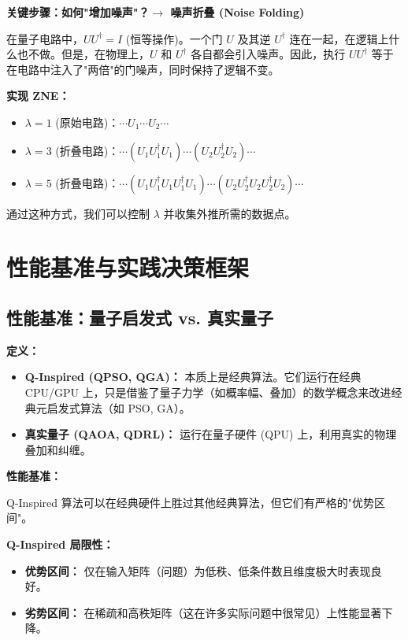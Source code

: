 \documentclass[11pt,a4paper]{article}
\begin{document}
\textbf{关键步骤：如何"增加噪声"？$\rightarrow$ 噪声折叠 (Noise Folding)}

在量子电路中，$U U^\dagger = I$ (恒等操作)。一个门 $U$ 及其逆 $U^\dagger$ 连在一起，在逻辑上什么也不做。但是，在物理上，$U$ 和 $U^\dagger$ 各自都会引入噪声。因此，执行 $U U^\dagger$ 等于在电路中注入了"两倍"的门噪声，同时保持了逻辑不变。

\textbf{实现 ZNE：}
\begin{itemize}
\item $\lambda=1$ (原始电路)：$\cdots U_1 \cdots U_2 \cdots$
\item $\lambda=3$ (折叠电路)：$\cdots (U_1 U_1^\dagger U_1) \cdots (U_2 U_2^\dagger U_2) \cdots$
\item $\lambda=5$ (折叠电路)：$\cdots (U_1 U_1^\dagger U_1 U_1^\dagger U_1) \cdots (U_2 U_2^\dagger U_2 U_2^\dagger U_2) \cdots$
\end{itemize}

通过这种方式，我们可以控制 $\lambda$ 并收集外推所需的数据点。

\section{性能基准与实践决策框架}

\subsection{性能基准：量子启发式 vs. 真实量子}

\textbf{定义：}

\begin{itemize}
\item \textbf{Q-Inspired (QPSO, QGA)：} 本质上是经典算法。它们运行在经典 CPU/GPU 上，只是借鉴了量子力学（如概率幅、叠加）的数学概念来改进经典元启发式算法（如 PSO, GA）。
\item \textbf{真实量子 (QAOA, QDRL)：} 运行在量子硬件 (QPU) 上，利用真实的物理叠加和纠缠。
\end{itemize}

\textbf{性能基准：}

Q-Inspired 算法可以在经典硬件上胜过其他经典算法，但它们有严格的"优势区间"。

\textbf{Q-Inspired 局限性：}
\begin{itemize}
\item \textbf{优势区间：} 仅在输入矩阵（问题）为低秩、低条件数且维度极大时表现良好。
\item \textbf{劣势区间：} 在稀疏和高秩矩阵（这在许多实际问题中很常见）上性能显著下降。
\end{itemize}
\end{document}
